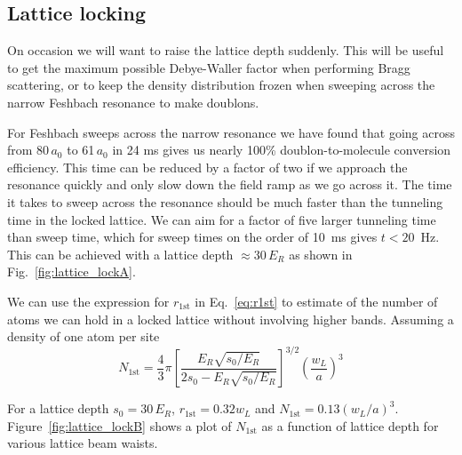 \documentclass[11pt,letter]{article}
\begin{document}
\subsection{Lattice locking}
\label{subsec:locking}

On occasion we will want to raise the lattice depth suddenly. This will be
useful to get the maximum possible Debye-Waller factor when performing Bragg
scattering,  or to keep the density distribution frozen when sweeping across
the narrow Feshbach resonance to make doublons.   

For Feshbach sweeps across the narrow resonance we have found that going across
from 80\,$a_{0}$ to 61\,$a_{0}$ in 24 ms gives us nearly 100\%
doublon-to-molecule conversion efficiency.  This time can be reduced by
a factor of two if we approach the resonance quickly and only slow down
the field ramp as we go across it.   The time it takes to sweep across the
resonance should be much faster than the tunneling time in the locked lattice.
We can aim for a factor of five larger tunneling time than sweep time, which
for sweep times on the order of 10~ms gives $t<20$~Hz.  This can be achieved
with a lattice depth $\approx 30\,E_{R}$ as shown in Fig.~\ref{fig:lattice_lockA}.  

We can use the expression for $r_{1\text{st}}$ in Eq.~\ref{eq:r1st} to estimate
of the number of atoms  we can hold in a locked lattice without involving
higher bands.  Assuming a density of one atom per site 
\begin{equation} 
 N_{1\text{st}} =  \frac{4}{3}\pi \left[ \frac{E_{R}\sqrt{s_{0}/E_{R}}}
                              {2s_{0}-E_{R}\sqrt{s_{0}/E_{R}}}  \right]^{3/2} 
                     \left( \frac{w_{L}}{a} \right)^{3} 
\end{equation}

For a lattice depth $s_{0}=30\,E_{R}$, $r_{1\text{st}} =
0.32 w_{L}$ and $N_{1\text{st}} = 0.13 (w_{L}/a)^{3}$.
Figure~\ref{fig:lattice_lockB} shows a plot of $N_{1\text{st}}$ as a function
of lattice depth for various lattice beam waists.  
\end{document}
